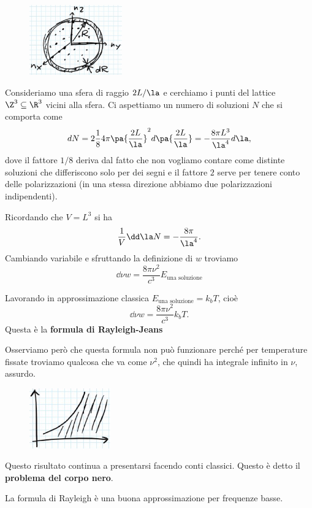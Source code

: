 \begin{figure}[!htb]
    \centering
    \includegraphics[width=4cm]{images/guscio_sferico.png}
\end{figure}

\noindent
Consideriamo una sfera di raggio $2L/\la$ e cerchiamo i punti del lattice $\Z^3\subseteq \R^3$ vicini alla sfera. Ci aspettiamo un numero di soluzioni $N$ che si comporta come
\[dN=2\frac18 4\pi \pa{\frac{2L}\la}^2 d\pa{\frac{2L}\la}=-\frac{8\pi L^3}{\la^4}d\la,\] 
dove il fattore $1/8$ deriva dal fatto che non vogliamo contare come distinte soluzioni che differiscono solo per dei segni e il fattore $2$ serve per tenere conto delle polarizzazioni (in una stessa direzione abbiamo due polarizzazioni indipendenti).\bigskip

\noindent
Ricordando che $V=L^3$ si ha
\[\frac1V\dd \la N=-\frac{8\pi}{\la^4}.\]
Cambiando variabile e sfruttando la definizione di $w$ troviamo
\[\boxed{\dd \nu w=\frac{8\pi \nu^2}{c^3}E_{\text{una soluzione}}}\]
\bigskip

\noindent
Lavorando in approssimazione classica $E_{\text{una soluzione}}=k_bT$, cio\`e
\[\dd \nu w=\frac{8\pi \nu^2}{c^3}k_b T.\]
Questa \`e la \textbf{formula di Rayleigh-Jeans}\bigskip

\noindent
Osserviamo per\`o che questa formula non pu\`o funzionare perch\'e per temperature fissate troviamo qualcosa che va come $\nu^2$, che quindi ha integrale infinito in $\nu$, assurdo.

\begin{figure}[!htb]
    \centering
    \includegraphics[width=3.5cm]{images/divergenza_problema_corpo_nero}
\end{figure}


\noindent
Questo risultato continua a presentarsi facendo conti classici. Questo \`e detto il \textbf{problema del corpo nero}.

\begin{remark}
La formula di Rayleigh \`e una buona approssimazione per frequenze basse.
\end{remark}


